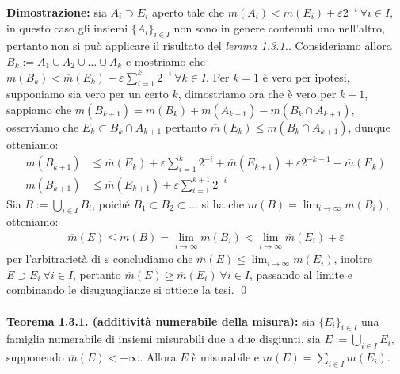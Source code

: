 \documentclass{article}
\numberwithin{equation}{subsection}
\begin{document}
\textbf{Dimostrazione:} sia $A_i \supset E_i$ aperto tale che $m(A_i) < \overline{m}(E_i) + \varepsilon2^{-i} \ \forall i \in I$, in questo caso gli insiemi $\{ A_i \}_{i \in I}$ non sono in genere contenuti uno nell'altro, pertanto non si può applicare il risultato del \textit{lemma 1.3.1.}. Consideriamo allora $B_k := A_1 \cup A_2 \cup \dots \cup A_k$ e mostriamo che $m(B_k) < \overline{m}(E_k) + \varepsilon \sum_{i = 1}^k 2^{-i} \ \forall k \in I$. Per $k = 1$ è vero per ipotesi, supponiamo sia vero per un certo $k$, dimostriamo ora che è vero per $k + 1$, sappiamo che $m(B_{k + 1}) = m(B_k) + m(A_{k + 1}) - m(B_k \cap A_{k + 1})$, osserviamo che $E_k \subset B_k \cap A_{k + 1}$ pertanto $\overline{m}(E_k) \leq m(B_k \cap A_{k + 1})$, dunque otteniamo:
\begin{align*}
    m(B_{k + 1}) &\leq \overline{m}(E_k) + \varepsilon \sum_{i = 1}^k 2^{-i} + \overline{m}(E_{k + 1}) + \varepsilon2^{-k - 1} - \overline{m}(E_k)  \\
    m(B_{k + 1}) &\leq \overline{m}(E_{k + 1}) + \varepsilon \sum_{i = 1}^{k + 1} 2^{-i} 
\end{align*}
Sia $B := \bigcup_{i \in I} B_i$, poiché $B_1 \subset B_2 \subset \dots$ si ha che $m(B) = \lim_{i \rightarrow \infty} m(B_i)$, otteniamo:
\begin{align*}
    \overline{m}(E) \leq m(B) = \lim_{i \rightarrow \infty} m(B_i) < \lim_{i \rightarrow \infty} \overline{m}(E_i) + \varepsilon 
\end{align*}
per l'arbitrarietà di $\varepsilon$ concludiamo che $\overline{m}(E) \leq \lim_{i \rightarrow \infty} m(E_i)$, inoltre $E \supset E_i \ \forall i \in I$, pertanto $\overline{m}(E) \geq \overline{m}(E_i) \ \forall i \in I$, passando al limite e combinando le disuguaglianze si ottiene la tesi. \qed \\ \\
\textbf{Teorema 1.3.1. (additività numerabile della misura):} sia $\{ E_i \}_{i \in I}$ una famiglia numerabile di insiemi misurabili due a due disgiunti, sia $E := \bigcup_{i \in I} E_i$, supponendo $\overline{m}(E) < + \infty$. Allora $E$ è misurabile e $m(E) = \sum_{i \in I} m(E_i)$. \\
\end{document}
